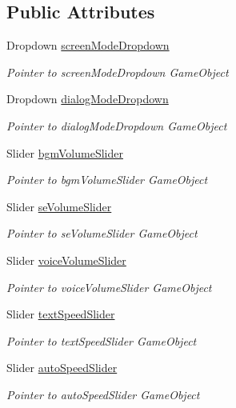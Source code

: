 \subsection*{Public Attributes}
\begin{DoxyCompactItemize}
\item 
Dropdown \hyperlink{classdoki_unity_1_1_config_board_manager_ac37a98165374ef322a2c23eb406ed3f0}{screen\+Mode\+Dropdown}
\begin{DoxyCompactList}\small\item\em Pointer to screen\+Mode\+Dropdown Game\+Object \end{DoxyCompactList}\item 
Dropdown \hyperlink{classdoki_unity_1_1_config_board_manager_aeb587ba6d601a3739400fff42b602ed3}{dialog\+Mode\+Dropdown}
\begin{DoxyCompactList}\small\item\em Pointer to dialog\+Mode\+Dropdown Game\+Object \end{DoxyCompactList}\item 
Slider \hyperlink{classdoki_unity_1_1_config_board_manager_ae773168ebe658d04aca52ad8015119b2}{bgm\+Volume\+Slider}
\begin{DoxyCompactList}\small\item\em Pointer to bgm\+Volume\+Slider Game\+Object \end{DoxyCompactList}\item 
Slider \hyperlink{classdoki_unity_1_1_config_board_manager_a4dc8f3c0f549c5f8cee74368c806d634}{se\+Volume\+Slider}
\begin{DoxyCompactList}\small\item\em Pointer to se\+Volume\+Slider Game\+Object \end{DoxyCompactList}\item 
Slider \hyperlink{classdoki_unity_1_1_config_board_manager_a303238a10ef64d16327d3dfefbfe021f}{voice\+Volume\+Slider}
\begin{DoxyCompactList}\small\item\em Pointer to voice\+Volume\+Slider Game\+Object \end{DoxyCompactList}\item 
Slider \hyperlink{classdoki_unity_1_1_config_board_manager_ae5a2ec891003c249e62dcd5113006d11}{text\+Speed\+Slider}
\begin{DoxyCompactList}\small\item\em Pointer to text\+Speed\+Slider Game\+Object \end{DoxyCompactList}\item 
Slider \hyperlink{classdoki_unity_1_1_config_board_manager_abda5b127dcedb869962f56947811bad4}{auto\+Speed\+Slider}
\begin{DoxyCompactList}\small\item\em Pointer to auto\+Speed\+Slider Game\+Object \end{DoxyCompactList}\end{DoxyCompactItemize}


